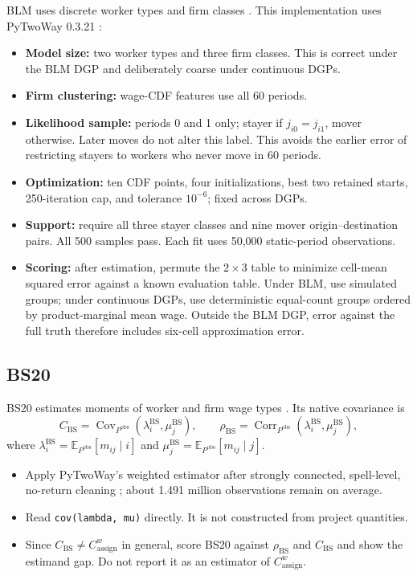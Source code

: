 \documentclass[11pt]{article}
\newcommand{\E}{\mathbb{E}}
\newcommand{\Cov}{\operatorname{Cov}}
\newcommand{\Cassign}{C^{w}_{\mathrm{assign}}}
\newcommand{\CBS}{C_{\mathrm{BS}}}
\newcommand{\rhoBS}{\rho_{\mathrm{BS}}}
\begin{document}
BLM uses discrete worker types and firm classes \cite{blm2019}.  This
implementation uses PyTwoWay 0.3.21 \cite{pytwoway}:
\begin{itemize}
\item \textbf{Model size:} two worker types and three firm classes.  This is
correct under the BLM DGP and deliberately coarse under continuous DGPs.
\item \textbf{Firm clustering:} wage-CDF features use all 60 periods.
\item \textbf{Likelihood sample:} periods 0 and 1 only; stayer if
$j_{i0}=j_{i1}$, mover otherwise.  Later moves do not alter this label.  This
avoids the earlier error of restricting stayers to workers who never move in
60 periods.
\item \textbf{Optimization:} ten CDF points, four initializations, best two
retained starts, 250-iteration cap, and tolerance $10^{-6}$; fixed across DGPs.
\item \textbf{Support:} require all three stayer classes and nine mover
origin--destination pairs.  All 500 samples pass.  Each fit uses 50,000
static-period observations.
\item \textbf{Scoring:} after estimation, permute the $2\times3$ table to
minimize cell-mean squared error against a known evaluation table.  Under BLM,
use simulated groups; under continuous DGPs, use deterministic equal-count
groups ordered by product-marginal mean wage.  Outside the BLM DGP, error
against the full truth therefore includes six-cell approximation error.
\end{itemize}

\subsection{BS20}

BS20 estimates moments of worker and firm wage types \cite{bs2020}.  Its native
covariance is
\begin{equation}
\CBS=\Cov_{P^{\mathrm{obs}}}(\lambda_i^{\mathrm{BS}},
\mu_j^{\mathrm{BS}}),\qquad
\rhoBS=\operatorname{Corr}_{P^{\mathrm{obs}}}(\lambda_i^{\mathrm{BS}},
\mu_j^{\mathrm{BS}}), \label{eq:bsnative}
\end{equation}
where $\lambda_i^{\mathrm{BS}}=\E_{P^{\mathrm{obs}}}[m_{ij}\mid i]$ and
$\mu_j^{\mathrm{BS}}=\E_{P^{\mathrm{obs}}}[m_{ij}\mid j]$.
\begin{itemize}
\item Apply PyTwoWay's weighted estimator after strongly connected,
spell-level, no-return cleaning \cite{pytwoway}; about 1.491 million
observations remain on average.
\item Read \texttt{cov(lambda, mu)} directly.  It is not constructed from
project quantities.
\item Since $\CBS\ne\Cassign$ in general, score BS20 against $\rhoBS$ and
$\CBS$ and show the estimand gap.  Do not report it as an estimator of
$\Cassign$.
\end{itemize}
\end{document}
